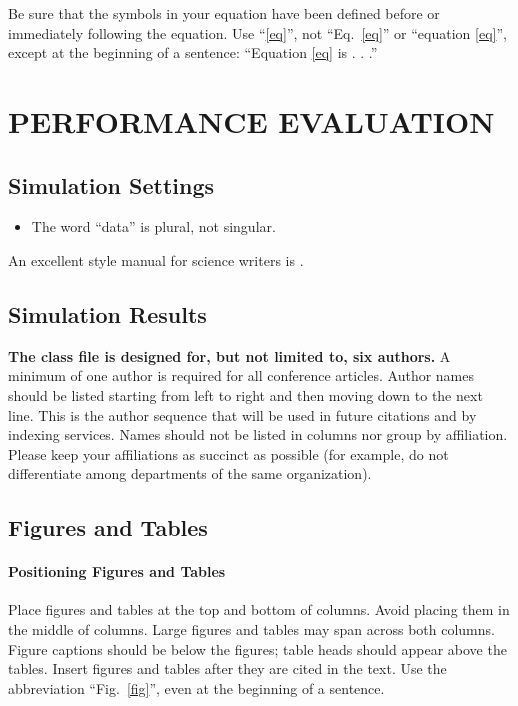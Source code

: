 \documentclass[conference]{IEEEtran}
\begin{document}
Be sure that the 
symbols in your equation have been defined before or immediately following 
the equation. Use ``\eqref{eq}'', not ``Eq.~\eqref{eq}'' or ``equation \eqref{eq}'', except at 
the beginning of a sentence: ``Equation \eqref{eq} is . . .''

\section{PERFORMANCE EVALUATION}


\subsection{Simulation Settings}\label{SCM}
\begin{itemize}
\item The word ``data'' is plural, not singular.

\end{itemize}
An excellent style manual for science writers is \cite{b7}.

\subsection{Simulation Results}
\textbf{The class file is designed for, but not limited to, six authors.} A 
minimum of one author is required for all conference articles. Author names 
should be listed starting from left to right and then moving down to the 
next line. This is the author sequence that will be used in future citations 
and by indexing services. Names should not be listed in columns nor group by 
affiliation. Please keep your affiliations as succinct as possible (for 
example, do not differentiate among departments of the same organization).


\subsection{Figures and Tables}
\paragraph{Positioning Figures and Tables} Place figures and tables at the top and 
bottom of columns. Avoid placing them in the middle of columns. Large 
figures and tables may span across both columns. Figure captions should be 
below the figures; table heads should appear above the tables. Insert 
figures and tables after they are cited in the text. Use the abbreviation 
``Fig.~\ref{fig}'', even at the beginning of a sentence.
\end{document}

